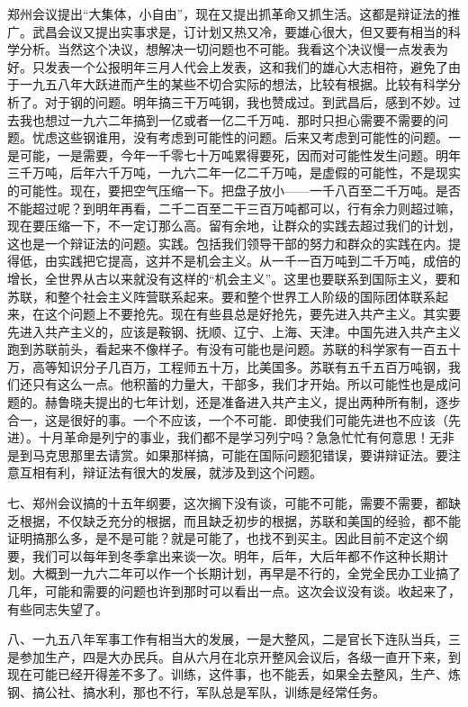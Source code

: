 郑州会议提出“大集体，小自由”，现在又提出抓革命又抓生活。这都是辩证法的推广。武昌会议又提出实事求是，订计划又热又冷，要雄心很大，但又要有相当的科学分析。当然这个决议，想解决一切问题也不可能。我看这个决议慢一点发表为好。只发表一个公报明年三月人代会上发表，这和我们的雄心大志相符，避免了由于一九五八年大跃进而产生的某些不切合实际的想法，比较有根据。比较有科学分析了。对于钢的问题。明年搞三干万吨钢，我也赞成过。到武昌后，感到不妙。过去我也想过一九六二年搞到一亿或者一亿二千万吨．那时只担心需要不需要的问题。忧虑这些钢谁用，没有考虑到可能性的问题。后来又考虑到可能性的问题。一是可能，一是需要，今年一千零七十万吨累得要死，因而对可能性发生问题。明年三千万吨，后年六千万吨，一九六二年一亿二千万吨，是虚假的可能性，不是现实的可能性。现在，要把空气压缩一下。把盘子放小——一千八百至二千万吨。是否不能超过呢？到明年再看，二千二百至二干三百万吨都可以，行有余力则超过嘛，现在要压缩一下，不一定订那么高。留有余地，让群众的实践去超过我们的计划，这也是一个辩证法的问题。实践。包括我们领导干部的努力和群众的实践在内。提得低，由实践把它提高，这并不是机会主义。从一千一百万吨到二千万吨，成倍的增长，全世界从古以来就没有这样的“机会主义”。这里也要联系到国际主义，要和苏联，和整个社会主义阵营联系起来。要和整个世界工人阶级的国际团体联系起来，在这个问题上不要抢先。现在有些县总是好抢先，要先进入共产主义。其实要先进入共产主义的，应该是鞍钢、抚顺、辽宁、上海、天津。中国先进入共产主义跑到苏联前头，看起来不像样子。有没有可能也是问题。苏联的科学家有一百五十万，高等知识分子几百万，工程师五十万，比美国多。苏联有五千五百万吨钢，我们还只有这么一点。他积蓄的力量大，干部多，我们才开始。所以可能性也是成问题的。赫鲁晓夫提出的七年计划，还是准备进入共产主义，提出两种所有制，逐步合一，这是很好的事。一个不应该，一个不可能．即使我们可能先进也不应该（先进）。十月革命是列宁的事业，我们都不是学习列宁吗？急急忙忙有何意思！无非是到马克思那里去请赏。如果那样搞，可能在国际问题犯错误，要讲辩证法。要注意互相有利，辩证法有很大的发展，就涉及到这个问题。

七、郑州会议搞的十五年纲要，这次搁下没有谈，可能不可能，需要不需要，都缺乏根据，不仅缺乏充分的根据，而且缺乏初步的根据，苏联和美国的经验，都不能证明搞那么多，是不是可能？就是可能了，也找不到买主。因此目前不定这个纲要，我们可以每年到冬季拿出来谈一次。明年，后年，大后年都不作这种长期计划。大概到一九六二年可以作一个长期计划，再早是不行的，全党全民办工业搞了几年，可能和需要的问题也许到那时可以看出一点。这次会议没有谈。收起来了，有些同志失望了。

八、一九五八年军事工作有相当大的发展，一是大整风，二是官长下连队当兵，三是参加生产，四是大办民兵。自从六月在北京开整风会议后，各级一直开下来，到现在可能已经开得差不多了。训练，这件事，也不能丢，如果全去整风，生产、炼钢、搞公社、搞水利，那也不行，军队总是军队，训练是经常任务。

